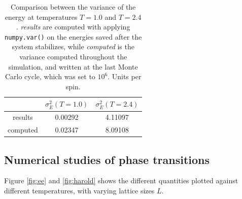 \documentclass{article}
\begin{document}
\begin{table}[H]
  \centering
  \label{tab:noo}
  \caption{Comparison between the variance of the energy at temperatures $T=1.0$ and $T=2.4$. \textit{results} are computed with applying \texttt{numpy.var()} on the energies saved after the system stabilizes, while \textit{computed} is the variance computed throughout the simulation, and written at the last Monte Carlo cycle, which was set to $10^6$. Units per spin.}
  \begin{tabular}{c|c|c}
    & $\sigma_E^2(T=1.0)$ & $\sigma_E^2(T=2.4)$\\\hline
    results & 0.00292 & 4.11097\\
    computed & 0.02347& 8.09108\\
  \end{tabular}
\end{table}

\subsection{Numerical studies of phase transitions}
Figure \ref{fig:ee} and \ref{fig:harold} shows the different quantities plotted against different temperatures, with varying lattice sizes $L$.
\end{document}
